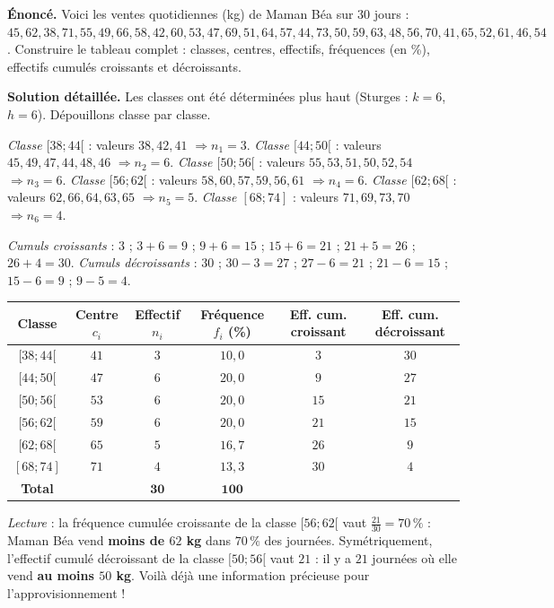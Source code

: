 \documentclass[11pt]{article}
\begin{document}
\begin{exoresolu}
\textbf{Énoncé.} Voici les ventes quotidiennes (kg) de Maman Béa sur $30$ jours :
$45, 62, 38, 71, 55, 49, 66, 58, 42, 60, 53, 47, 69, 51, 64, 57, 44, 73, 50, 59, 63, 48, 56, 70, 41, 65, 52, 61, 46, 54$.
Construire le tableau complet : classes, centres, effectifs, fréquences (en \%), effectifs cumulés croissants et décroissants.

\tcblower
\textbf{Solution détaillée.} Les classes ont été déterminées plus haut (Sturges : $k=6$, $h=6$). Dépouillons classe par classe.

\emph{Classe $[38;44[$} : valeurs $38, 42, 41$ $\Rightarrow n_1 = 3$.
\emph{Classe $[44;50[$} : valeurs $45, 49, 47, 44, 48, 46$ $\Rightarrow n_2 = 6$.
\emph{Classe $[50;56[$} : valeurs $55, 53, 51, 50, 52, 54$ $\Rightarrow n_3 = 6$.
\emph{Classe $[56;62[$} : valeurs $58, 60, 57, 59, 56, 61$ $\Rightarrow n_4 = 6$.
\emph{Classe $[62;68[$} : valeurs $62, 66, 64, 63, 65$ $\Rightarrow n_5 = 5$.
\emph{Classe $[68;74]$} : valeurs $71, 69, 73, 70$ $\Rightarrow n_6 = 4$.

\emph{Cumuls croissants} : $3$ ; $3+6=9$ ; $9+6=15$ ; $15+6=21$ ; $21+5=26$ ; $26+4=30$.
\emph{Cumuls décroissants} : $30$ ; $30-3=27$ ; $27-6=21$ ; $21-6=15$ ; $15-6=9$ ; $9-5=4$.

\begin{center}
\begin{tabular}{|c|c|c|c|c|c|}
\hline
\rowcolor{popblueL} Classe & Centre $c_i$ & Effectif $n_i$ & Fréquence $f_i$ (\%) & Eff. cum. croissant & Eff. cum. décroissant \\
\hline
$[38;44[$ & $41$ & $3$ & $10,0$ & $3$ & $30$ \\
\hline
$[44;50[$ & $47$ & $6$ & $20,0$ & $9$ & $27$ \\
\hline
$[50;56[$ & $53$ & $6$ & $20,0$ & $15$ & $21$ \\
\hline
$[56;62[$ & $59$ & $6$ & $20,0$ & $21$ & $15$ \\
\hline
$[62;68[$ & $65$ & $5$ & $16,7$ & $26$ & $9$ \\
\hline
$[68;74]$ & $71$ & $4$ & $13,3$ & $30$ & $4$ \\
\hline
\rowcolor{popgoldL} \textbf{Total} & & $\mathbf{30}$ & $\mathbf{100}$ & & \\
\hline
\end{tabular}
\end{center}

\emph{Lecture} : la fréquence cumulée croissante de la classe $[56;62[$ vaut $\frac{21}{30} = 70\,\%$ : Maman Béa vend \textbf{moins de $62$ kg} dans $70\,\%$ des journées. Symétriquement, l'effectif cumulé décroissant de la classe $[50;56[$ vaut $21$ : il y a $21$ journées où elle vend \textbf{au moins $50$ kg}. Voilà déjà une information précieuse pour l'approvisionnement !
\end{exoresolu}
\end{document}
